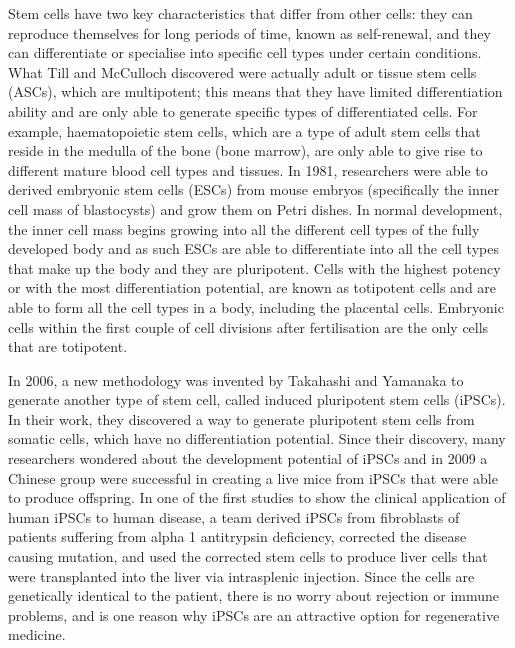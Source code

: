 Stem cells have two key characteristics that differ from other cells: they can reproduce themselves for long periods of time, known as self-renewal, and they can differentiate or specialise into specific cell types under certain conditions. What Till and McCulloch discovered were actually adult or tissue stem cells (ASCs), which are multipotent; this means that they have limited differentiation ability and are only able to generate specific types of differentiated cells. For example, haematopoietic stem cells, which are a type of adult stem cells that reside in the medulla of the bone (bone marrow), are only able to give rise to different mature blood cell types and tissues. In 1981, researchers were able to derived embryonic stem cells (ESCs) from mouse embryos (specifically the inner cell mass of blastocysts) and grow them on Petri dishes\cite{pmid7242681, pmid6950406}. In normal development, the inner cell mass begins growing into all the different cell types of the fully developed body and as such ESCs are able to differentiate into all the cell types that make up the body and they are pluripotent. Cells with the highest potency or with the most differentiation potential, are known as totipotent cells and are able to form all the cell types in a body, including the placental cells. Embryonic cells within the first couple of cell divisions after fertilisation are the only cells that are totipotent.

In 2006, a new methodology was invented by Takahashi and Yamanaka to generate another type of stem cell, called induced pluripotent stem cells (iPSCs)\cite{pmid16904174}. In their work, they discovered a way to generate pluripotent stem cells from somatic cells, which have no differentiation potential. Since their discovery, many researchers wondered about the development potential of iPSCs and in 2009 a Chinese group were successful in creating a live mice from iPSCs that were able to produce offspring\cite{pmid19672241}. In one of the first studies to show the clinical application of human iPSCs to human disease, a team derived iPSCs from fibroblasts of patients suffering from alpha 1 antitrypsin deficiency, corrected the disease causing mutation, and used the corrected stem cells to produce liver cells that were transplanted into the liver via intrasplenic injection\cite{pmid21993621}. Since the cells are genetically identical to the patient, there is no worry about rejection or immune problems, and is one reason why iPSCs are an attractive option for regenerative medicine.

